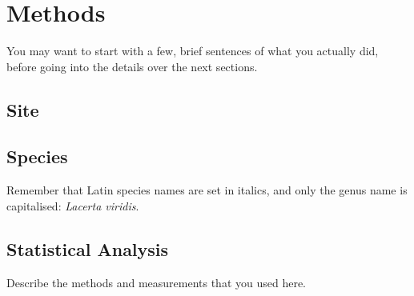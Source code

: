 \chapter{Methods}
\label{ch:methods}
You may want to start with a few, brief sentences of what you actually did, before going into the details over the next sections.

\section{Site}
\section{Species}
 Remember that Latin species names are set in italics, and only the genus name is capitalised: \emph{Lacerta viridis}.
\section{Statistical Analysis}

  Describe the methods and measurements that you used here.

